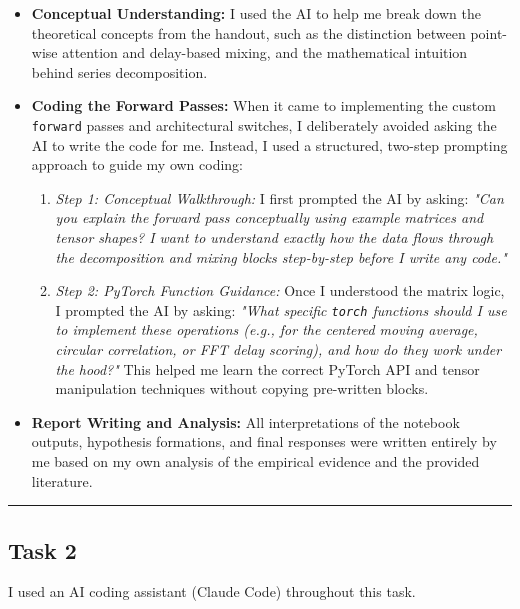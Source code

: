 \documentclass[11pt,letterpaper]{article}
\begin{document}
\begin{itemize}
    \item \textbf{Conceptual Understanding:} I used the AI to help me break down the theoretical concepts from the handout, such as the distinction between point-wise attention and delay-based mixing, and the mathematical intuition behind series decomposition.
    
    \item \textbf{Coding the Forward Passes:} When it came to implementing the custom \texttt{forward} passes and architectural switches, I deliberately avoided asking the AI to write the code for me. Instead, I used a structured, two-step prompting approach to guide my own coding:
    \begin{enumerate}
        \item \textit{Step 1: Conceptual Walkthrough:} I first prompted the AI by asking: \textit{"Can you explain the forward pass conceptually using example matrices and tensor shapes? I want to understand exactly how the data flows through the decomposition and mixing blocks step-by-step before I write any code."}
        \item \textit{Step 2: PyTorch Function Guidance:} Once I understood the matrix logic, I prompted the AI by asking: \textit{"What specific \texttt{torch} functions should I use to implement these operations (e.g., for the centered moving average, circular correlation, or FFT delay scoring), and how do they work under the hood?"} This helped me learn the correct PyTorch API and tensor manipulation techniques without copying pre-written blocks.
    \end{enumerate}
    
    \item \textbf{Report Writing and Analysis:} All interpretations of the notebook outputs, hypothesis formations, and final responses were written entirely by me based on my own analysis of the empirical evidence and the provided literature.
\end{itemize}

\vspace{10pt}
\hrule
\vspace{4pt}

\subsection*{Task 2}
I used an AI coding assistant (Claude Code) throughout this task. 
\end{document}
